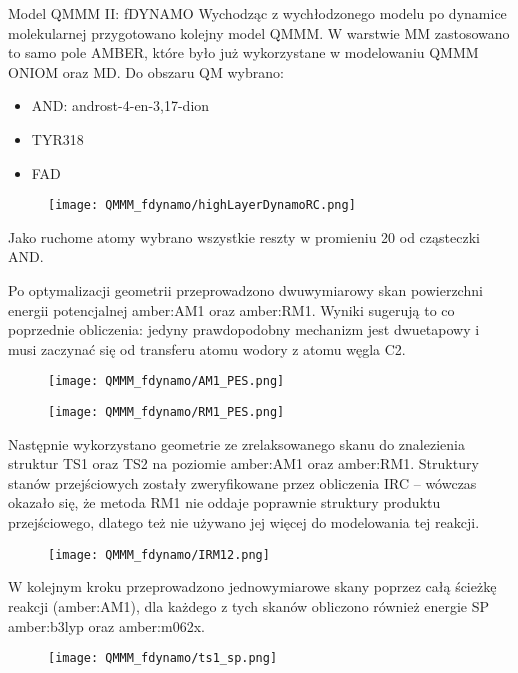 \begin{section}{Model QMMM II: fDYNAMO}
Wychodząc z wychłodzonego modelu po dynamice molekularnej przygotowano kolejny model QMMM. W warstwie MM zastosowano to samo pole AMBER, które było już wykorzystane
w modelowaniu QMMM ONIOM oraz MD. Do obszaru QM wybrano:

\begin{itemize}
 \item AND: androst-4-en-3,17-dion
 \item TYR318
 \item FAD
\end{itemize}


 \begin{figure}[H]
  \texttt{[image: QMMM\_fdynamo/highLayerDynamoRC.png]}
\end{figure}

Jako ruchome atomy wybrano wszystkie reszty w promieniu 20 \angstrom od cząsteczki AND.

Po optymalizacji geometrii przeprowadzono dwuwymiarowy skan powierzchni energii potencjalnej amber:AM1 oraz amber:RM1. Wyniki sugerują to co poprzednie obliczenia: jedyny
prawdopodobny mechanizm  jest dwuetapowy i musi zaczynać się od transferu atomu wodory z atomu węgla C2.

 \begin{figure}[H]
  \texttt{[image: QMMM\_fdynamo/AM1\_PES.png]}
\end{figure}

 \begin{figure}[H]
  \texttt{[image: QMMM\_fdynamo/RM1\_PES.png]}
\end{figure}

Następnie wykorzystano geometrie ze zrelaksowanego skanu do znalezienia struktur TS1 oraz TS2 na poziomie amber:AM1 oraz amber:RM1. Struktury stanów przejściowych zostały zweryfikowane
przez obliczenia IRC -- wówczas okazało się, że metoda RM1 nie oddaje poprawnie struktury produktu przejściowego, dlatego też nie używano jej więcej do modelowania tej reakcji.

 \begin{figure}[H]
  \texttt{[image: QMMM\_fdynamo/IRM12.png]}
\end{figure}


W kolejnym kroku przeprowadzono jednowymiarowe skany poprzez całą ścieżkę reakcji (amber:AM1), dla każdego z tych skanów obliczono również energie SP amber:b3lyp oraz amber:m062x.
 \begin{figure}[H]
  \texttt{[image: QMMM\_fdynamo/ts1\_sp.png]}
\end{figure}


\end{section}
